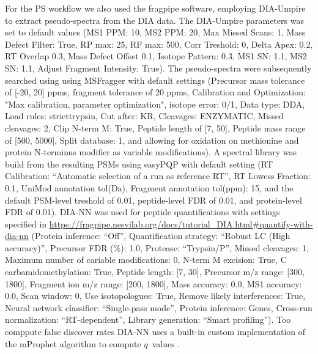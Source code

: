 \documentclass[10pt,letterpaper]{article}
\begin{document}
For the PS workflow we also used the fragpipe software, employing DIA-Umpire to extract pseudo-spectra from the DIA data. The DIA-Umpire parameters was set to default values (MS1 PPM: 10, MS2 PPM: 20, Max Missed Scans: 1, Mass Defect Filter: True, RP max: 25, RF max: 500, Corr Treshold: 0, Delta Apex: 0.2, RT Overlap 0.3, Mass Defect Offset 0.1, Isotope Pattern: 0.3, MS1 SN: 1.1, MS2 SN: 1.1, Adjust Fragment Intensity: True). The pseudo-spectra were subsequently searched using using MSFragger with default settings (Precursor mass tolerance of [-20, 20] ppms, fragment tolerance of 20 ppms, Calibration and Optimization: "Max calibration, parameter optimization", isotope error: 0/1, Data type: DDA, Load rules: stricttrypsin, Cut after: KR, Cleavages: ENZYMATIC, Missed cleavages: 2, Clip N-term M: True, Peptide length of [7, 50], Peptide mass range of [500, 5000], Split database: 1, and allowing for oxidation on methionine and protein N-terminus modifier as variable modifications). A spectral library was build from the resulting PSMs using easyPQP with default setting (RT Calibration: ``Automatic selection of a run as reference RT'', RT Lowess Fraction: 0.1, UniMod annotation tol(Da), Fragment annotation tol(ppm): 15, and the default PSM-level treshold of 0.01, peptide-level FDR of 0.01, and protein-level FDR of 0.01). DIA-NN was used for peptide quantifications with settings specified in \url{https://fragpipe.nesvilab.org/docs/tutorial_DIA.html#quantify-with-dia-nn} (Protein inference: ``Off'', Quantification strategy: ``Robust LC (High accuracy)'', Precursor FDR (\%): 1.0, Protease: ``Trypsin/P'', Missed cleavages: 1, Maximum number of cariable modifications: 0, N-term M excision: True, C carbamidomethylation: True, Peptide length: [7, 30], Precursor m/z range: [300, 1800], Fragment ion m/z range: [200, 1800], Mass accuracy: 0.0, MS1 accuracy: 0.0, Scan window: 0, Use isotopologues: True, Remove likely interferences: True, Neural network classifier: ``Single-pass mode'', Protein inference: Genes, Cross-run normalization: ``RT-dependent'', Library generation: ``Smart profiling''). Too comppute false discover rates DIA-NN uses a built-in custom implementation of the mProphet algorithm to compute $q$~values \cite{reiter2011mprophet, demichev2020dia}.
 
 
\end{document}
